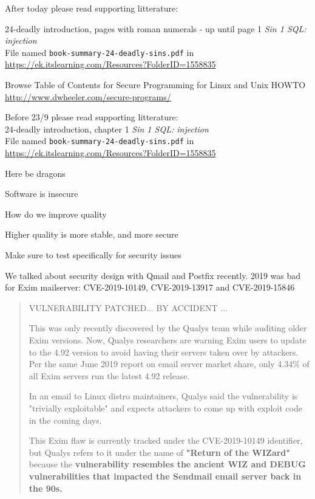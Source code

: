 \documentclass[Screen16to9,17pt]{foils}
\begin{document}

After today please read supporting litterature:
\begin{list2}
\item 24‑deadly introduction, pages with roman numerals - up until page 1 \emph{Sin 1 SQL: injection}\\
File named \verb+book-summary-24-deadly-sins.pdf+ in \url{https://ek.itslearning.com/Resources?FolderID=1558835}
\item Browse Table of Contents for Secure Programming for Linux and Unix HOWTO\\
\url{http://www.dwheeler.com/secure-programs/}
\end{list2}

\begin{list2}
\item
Before 23/9 please read supporting litterature:\\
24‑deadly introduction, chapter 1 \emph{Sin 1 SQL: injection}\\
File named \verb+book-summary-24-deadly-sins.pdf+ in \url{https://ek.itslearning.com/Resources?FolderID=1558835}
\end{list2}




Here be dragons
\begin{list2}
\item Software is insecure
\item How do we improve quality
\item Higher quality is more stable, and more secure
\item Make sure to test specifically for security issues
\end{list2}

We talked about security design with Qmail and Postfix recently. 2019 was bad for Exim mailserver: CVE-2019-10149, CVE-2019-13917 and CVE-2019-15846


\begin{quote}
  VULNERABILITY PATCHED... BY ACCIDENT
...

This was only recently discovered by the Qualys team while auditing older Exim versions. Now, Qualys researchers are warning Exim users to update to the 4.92 version to avoid having their servers taken over by attackers. Per the same June 2019 report on email server market share, only 4.34\% of all Exim servers run the latest 4.92 release.

In an email to Linux distro maintainers, Qualys said the vulnerability is "trivially exploitable" and expects attackers to come up with exploit code in the coming days.

This Exim flaw is currently tracked under the CVE-2019-10149 identifier, but Qualys refers to it under the name of \textbf{"Return of the WIZard"} because the \textbf{vulnerability resembles the ancient WIZ and DEBUG vulnerabilities that impacted the Sendmail email server back in the 90s.}
\end{quote}
\end{document}
